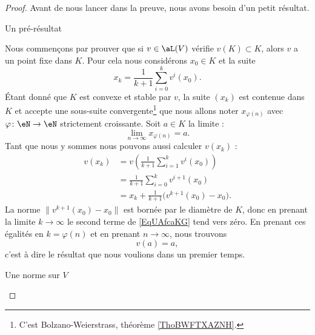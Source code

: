 \begin{proof}
    Avant de nous lancer dans la preuve, nous avons besoin d'un petit résultat.
    \begin{subproof}
        \item[Un pré-résultat]

        Nous commençons par prouver que si \( v\in \aL(V)\) vérifie \( v(K)\subset K\), alors \( v\) a un point fixe dans \( K\). Pour cela nous considérons \( x_0\in K\) et la suite
        \begin{equation}
            x_k=\frac{1}{ k+1 }\sum_{i=0}^kv^i(x_0).
        \end{equation}
        Étant donné que \( K\) est convexe et stable par \( v\), la suite \( (x_k)\) est contenue dans \( K\) et accepte une sous-suite convergente\footnote{C'est Bolzano-Weierstrass, théorème \ref{ThoBWFTXAZNH}.} que nous allons noter \( x_{\varphi(n)}\) avec \( \varphi\colon \eN\to \eN\) strictement croissante. Soit \( a\in K\) la limite :
        \begin{equation}
            \lim_{n\to \infty} x_{\varphi(n)}=a.
        \end{equation}
        Tant que nous y sommes nous pouvons aussi calculer \( v(x_k)\) :
        \begin{subequations}
            \begin{align}
                v(x_k)&=v\left( \frac{1}{ k+1 }\sum_{i=1}^kv^i(x_0) \right)\\
                &=\frac{1}{ k+1 }\sum_{i=0}^kv^{i+1}(x_0)\\
                &=x_k+\frac{1}{ k+1 }\Big( v^{k+1}(x_0)-x_0 \Big).      \label{EqUAfcaKG}
            \end{align}
        \end{subequations}
        La norme \( \| v^{k+1}(x_0)-x_0 \|\) est bornée par le diamètre de \( K\), donc en prenant la limite \( k\to \infty\) le second terme de \eqref{EqUAfcaKG} tend vers zéro. En prenant ces égalités en \( k=\varphi(n)\) et en prenant \( n\to\infty\), nous trouvons
        \begin{equation}
            v(a)=a,
        \end{equation}
        c'est à dire le résultat que nous voulions dans un premier temps.

    \item[Une norme sur \( V\)]


\end{subproof}
\end{proof}
